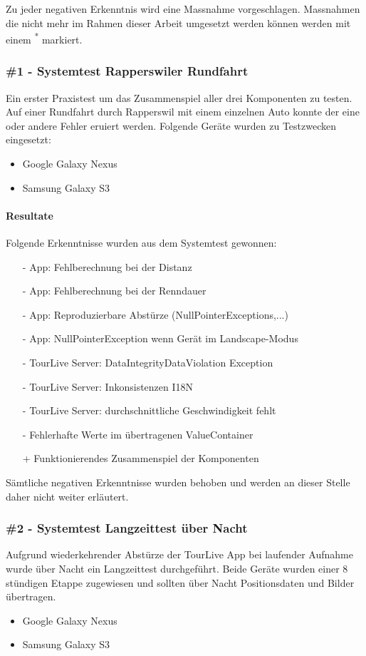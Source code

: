 Zu jeder negativen Erkenntnis wird eine Massnahme vorgeschlagen. Massnahmen die nicht mehr im Rahmen dieser Arbeit umgesetzt werden können werden mit einem  \textsuperscript{*} markiert.

\subsubsection{\#1 - Systemtest Rapperswiler Rundfahrt}
Ein erster Praxistest um das Zusammenspiel aller drei Komponenten zu testen. Auf einer Rundfahrt durch Rapperswil mit einem einzelnen Auto konnte der eine oder andere Fehler eruiert werden. Folgende Geräte wurden zu Testzwecken eingesetzt:
\begin{itemize}
	\item{Google Galaxy Nexus}
	\item{Samsung Galaxy S3}
\end{itemize}

\paragraph*{Resultate}

Folgende Erkenntnisse wurden aus dem Systemtest gewonnen:
\begin{itemize}[noitemsep,topsep=0pt]
	\item[-] App: Fehlberechnung bei der Distanz
	\item[-] App: Fehlberechnung bei der Renndauer
	\item[-] App: Reproduzierbare Abstürze (NullPointerExceptions,...)
	\item[-] App: NullPointerException wenn Gerät im Landscape-Modus
	\item[-] TourLive Server: DataIntegrityDataViolation Exception
	\item[-] TourLive Server: Inkonsistenzen I18N
	\item[-] TourLive Server: durchschnittliche Geschwindigkeit fehlt
	\item[-] Fehlerhafte Werte im übertragenen ValueContainer
	\item[+] Funktionierendes Zusammenspiel der Komponenten
\end{itemize}
Sämtliche negativen Erkenntnisse wurden behoben und werden an dieser Stelle daher nicht weiter erläutert.

\subsubsection{\#2 - Systemtest Langzeittest über Nacht}
Aufgrund wiederkehrender Abstürze der TourLive App bei laufender Aufnahme wurde über Nacht ein Langzeittest durchgeführt. Beide Geräte wurden einer 8 stündigen Etappe zugewiesen und sollten über Nacht Positionsdaten und Bilder übertragen. 
\begin{itemize} [noitemsep,topsep=0pt]
	\item{Google Galaxy Nexus}
	\item{Samsung Galaxy S3}
\end{itemize}

